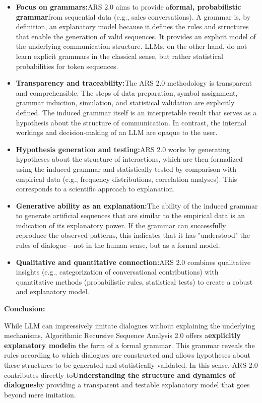 \documentclass[
]{article}
\begin{document}
\begin{itemize}
\item
  \textbf{Focus on grammars:}ARS 2.0 aims to provide a\textbf{formal,
  probabilistic grammar}from sequential data (e.g., sales
  conversations). A grammar is, by definition, an explanatory model
  because it defines the rules and structures that enable the generation
  of valid sequences. It provides an explicit model of the underlying
  communication structure. LLMs, on the other hand, do not learn
  explicit grammars in the classical sense, but rather statistical
  probabilities for token sequences.
\item
  \textbf{Transparency and traceability:}The ARS 2.0 methodology is
  transparent and comprehensible. The steps of data preparation, symbol
  assignment, grammar induction, simulation, and statistical validation
  are explicitly defined. The induced grammar itself is an interpretable
  result that serves as a hypothesis about the structure of
  communication. In contrast, the internal workings and decision-making
  of an LLM are opaque to the user.
\item
  \textbf{Hypothesis generation and testing:}ARS 2.0 works by generating
  hypotheses about the structure of interactions, which are then
  formalized using the induced grammar and statistically tested by
  comparison with empirical data (e.g., frequency distributions,
  correlation analyses). This corresponds to a scientific approach to
  explanation.
\item
  \textbf{Generative ability as an explanation:}The ability of the
  induced grammar to generate artificial sequences that are similar to
  the empirical data is an indication of its explanatory power. If the
  grammar can successfully reproduce the observed patterns, this
  indicates that it has "understood" the rules of dialogue---not in the
  human sense, but as a formal model.
\item
  \textbf{Qualitative and quantitative connection:}ARS 2.0 combines
  qualitative insights (e.g., categorization of conversational
  contributions) with quantitative methods (probabilistic rules,
  statistical tests) to create a robust and explanatory model.
\end{itemize}

\textbf{Conclusion:}

While LLM can impressively imitate dialogues without explaining the
underlying mechanisms, Algorithmic Recursive Sequence Analysis 2.0
offers a\textbf{explicitly explanatory model}in the form of a formal
grammar. This grammar reveals the rules according to which dialogues are
constructed and allows hypotheses about these structures to be generated
and statistically validated. In this sense, ARS 2.0 contributes directly
to\textbf{Understanding the structure and dynamics of dialogues}by
providing a transparent and testable explanatory model that goes beyond
mere imitation.
\end{document}
